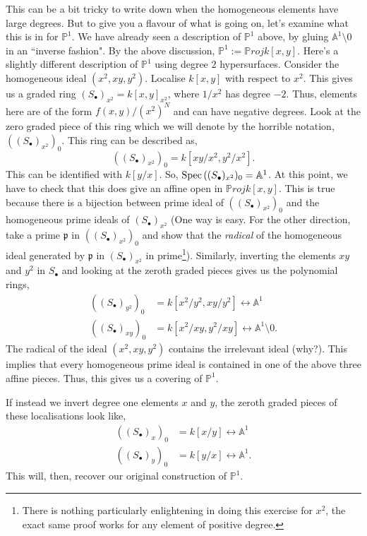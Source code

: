 \documentclass[11pt]{amsart}
\newcommand{\Proj}{{\P roj}}
\newcommand{\Spec}{{\rm Spec \,}}
\newcommand{\A}{{\mathbb A}}
\renewcommand{\P}{{\mathbb P}}
\theoremstyle{definition}
\begin{document}
This can be a bit tricky to write down when the homogeneous elements have large degrees. But to give you a flavour of what is going on, let's examine what this is in for $\P^1$. We have already seen a description of $\P^1$ above, by gluing $\A^1\setminus 0$ in an ``inverse fashion".  By the above discussion, $\P^1:=\Proj k[x,y]$. Here's a slightly different description of $\P^1$ using degree $2$ hypersurfaces. Consider the homogeneous ideal $(x^2,xy,y^2)$. Localise $k[x,y]$ with respect to $x^2$. This gives us a graded ring $(S_{\bullet})_{x^2}=k[x,y]_{x^2}$, where $1/x^2$ has degree $-2$. Thus, elements here are of the form $f(x,y)/(x^{2})^N$ and can have negative degrees. Look at the zero graded piece of this ring which we will denote by the horrible notation, $((S_{\bullet})_{x^2})_0$. This ring can be described as,
\[((S_{\bullet})_{x^2})_0=k[xy/x^2,y^2/x^2].\]
This can be identified with $k[y/x]$. So, $\Spec ((S_{\bullet})_{x^2})_0=\A^1$. At this point, we have to check that this does give an affine open in $\Proj k[x,y]$. This is true because there is a bijection between prime ideal of $((S_{\bullet})_{x^2})_0$ and the homogeneous prime ideals of $(S_{\bullet})_{x^2}$ (One way is easy. For the other direction, take a prime $\mathfrak{p}$ in $((S_{\bullet})_{x^2})_0$ and show that the \textit{radical} of the homogeneous ideal generated by $\mathfrak{p}$ in $(S_{\bullet})_{x^2}$ in prime\footnote{There is nothing particularly enlightening in doing this exercise for $x^2$, the exact same proof works for any element of positive degree.}). Similarly, inverting the elements $xy$ and $y^2$ in $S_{\bullet}$ and looking at the zeroth graded pieces gives us the polynomial rings,
\begin{align*}
((S_{\bullet})_{y^2})_0 &=k[x^2/y^2,xy/y^2]\longleftrightarrow \A^1\\
((S_{\bullet})_{xy})_0 &=k[x^2/xy,y^2/xy]\longleftrightarrow \A^1\setminus 0.
\end{align*}
The radical of the ideal $(x^2,xy,y^2)$ contains the irrelevant ideal (why?). This implies that every homogeneous prime ideal is contained in one of the above three affine pieces. Thus, this gives us a covering of $\P^1$.

If instead we invert degree one elements $x$ and $y$, the zeroth graded pieces of these localisations look like,
\begin{align*}
((S_{\bullet})_{x})_0 &=k[x/y]\longleftrightarrow\A^1\\
((S_{\bullet})_{y})_0 &=k[y/x]\longleftrightarrow\A^1.
\end{align*}
This will, then, recover our original construction of $\P^1$.
\end{document}
